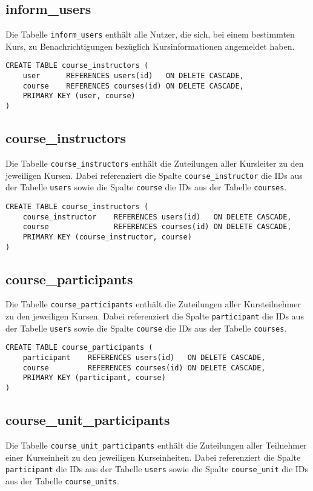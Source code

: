 \subsection{inform\_users}
Die Tabelle \texttt{inform\_users} enthält alle Nutzer, die sich, bei einem bestimmten Kurs, zu Benachrichtigungen bezüglich Kursinformationen angemeldet haben.

\begin{verbatim}
CREATE TABLE course_instructors (
    user      REFERENCES users(id)   ON DELETE CASCADE,
    course    REFERENCES courses(id) ON DELETE CASCADE,
    PRIMARY KEY (user, course)
)
\end{verbatim}

\subsection{course\_instructors}
Die Tabelle \texttt{course\_instructors} enthält die Zuteilungen aller Kursleiter zu den jeweiligen Kursen. Dabei referenziert die Spalte \texttt{course\_instructor} die IDs aus der Tabelle \texttt{users} sowie die Spalte \texttt{course} die IDs aus der Tabelle \texttt{courses}.

\begin{verbatim}
CREATE TABLE course_instructors (
    course_instructor    REFERENCES users(id)   ON DELETE CASCADE,
    course               REFERENCES courses(id) ON DELETE CASCADE,
    PRIMARY KEY (course_instructor, course)
)
\end{verbatim}

\subsection{course\_participants}
Die Tabelle \texttt{course\_participants} enthält die Zuteilungen aller Kursteilnehmer zu den jeweiligen Kursen. Dabei referenziert die Spalte \texttt{participant} die IDs aus der Tabelle \texttt{users} sowie die Spalte \texttt{course} die IDs aus der Tabelle \texttt{courses}.

\begin{verbatim}
CREATE TABLE course_participants (
    participant    REFERENCES users(id)   ON DELETE CASCADE,
    course         REFERENCES courses(id) ON DELETE CASCADE,
    PRIMARY KEY (participant, course)
)
\end{verbatim}

\subsection{course\_unit\_participants}
Die Tabelle \texttt{course\_unit\_participants} enthält die Zuteilungen aller Teilnehmer einer Kurseinheit zu den jeweiligen Kurseinheiten. Dabei referenziert die Spalte \texttt{participant} die IDs aus der Tabelle \texttt{users} sowie die Spalte \texttt{course\_unit} die IDs aus der Tabelle \texttt{course\_units}.

